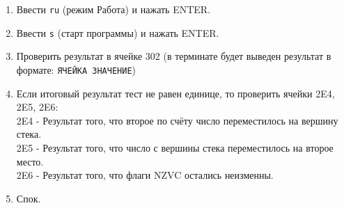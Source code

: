 \begin{enumerate}
{                        ST  RESMAIN \\
                        HLT         \\
            RESMAIN:    WORD 0x0    \\
END}
    \item Ввести \texttt{ru} (режим Работа) и нажать ENTER.
    \item Ввести \texttt{s} (старт программы) и нажать ENTER.
    \item Проверить результат в ячейке 302 (в терминате будет выведен результат в формате: \texttt{ЯЧЕЙКА ЗНАЧЕНИЕ})
    \item Если итоговый результат тест не равен единице, то проверить ячейки 2E4, 2E5, 2E6:\\
    2E4 - Результат того, что второе по счёту число переместилось на вершину стека. \\
    2E5 - Результат того, что число с вершины стека переместилось на второе место.  \\
    2E6 - Результат того, что флаги NZVC остались неизменны.
    \item Спок.
\end{enumerate}
%
